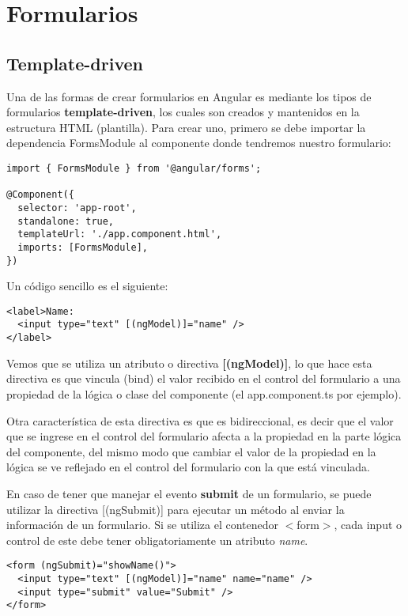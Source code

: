 \section{Formularios}


\subsection{Template-driven}

Una de las formas de crear formularios en Angular es mediante los tipos de formularios \textbf{template-driven}, los cuales son creados y mantenidos en la estructura HTML (plantilla). Para crear uno, primero se debe importar la dependencia FormsModule al componente donde tendremos nuestro formulario:
\begin{lstlisting}[style=htmlcssjs]
import { FormsModule } from '@angular/forms';

@Component({
  selector: 'app-root',
  standalone: true,
  templateUrl: './app.component.html',
  imports: [FormsModule],
})
\end{lstlisting}

Un código sencillo es el siguiente:
\begin{lstlisting}[style=htmlcssjs]
<label>Name: 
  <input type="text" [(ngModel)]="name" />
</label>
\end{lstlisting}

Vemos que se utiliza un atributo o directiva \textbf{[(ngModel)]}, lo que hace esta directiva es que vincula (bind) el valor recibido en el control del formulario a una propiedad de la lógica o clase del componente (el app.component.ts por ejemplo).

Otra característica de esta directiva es que es bidireccional, es decir que el valor que se ingrese en el control del formulario afecta a la propiedad en la parte lógica del componente, del mismo modo que cambiar el valor de la propiedad en la lógica se ve reflejado en el control del formulario con la que está vinculada.

En caso de tener que manejar el evento \textbf{submit} de un formulario, se puede utilizar la directiva [(ngSubmit)] para ejecutar un método al enviar la información de un formulario. Si se utiliza el contenedor $<$form$>$, cada input o control de este debe tener obligatoriamente un atributo \textit{name}.
\begin{lstlisting}[style=htmlcssjs]
<form (ngSubmit)="showName()">
  <input type="text" [(ngModel)]="name" name="name" />
  <input type="submit" value="Submit" />
</form>
\end{lstlisting}


